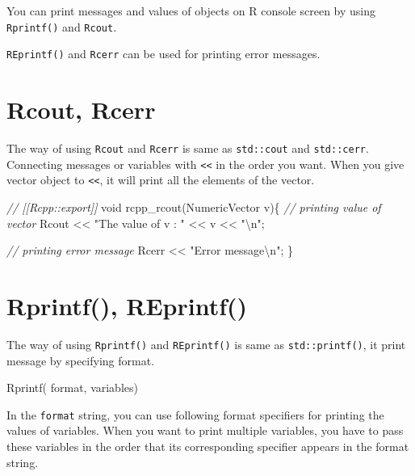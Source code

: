 \documentclass[]{book}
\newenvironment{Shaded}{\begin{snugshade}}{\end{snugshade}}
\newcommand{\DataTypeTok}[1]{\textcolor[rgb]{0.13,0.29,0.53}{#1}}
\newcommand{\SpecialCharTok}[1]{\textcolor[rgb]{0.00,0.00,0.00}{#1}}
\newcommand{\StringTok}[1]{\textcolor[rgb]{0.31,0.60,0.02}{#1}}
\newcommand{\CommentTok}[1]{\textcolor[rgb]{0.56,0.35,0.01}{\textit{#1}}}
\newcommand{\NormalTok}[1]{#1}
\theoremstyle{definition}
\theoremstyle{definition}
\theoremstyle{remark}
\begin{document}
You can print messages and values of objects on R console screen by
using \texttt{Rprintf()} and \texttt{Rcout}.

\texttt{REprintf()} and \texttt{Rcerr} can be used for printing error
messages.

\section{Rcout, Rcerr}\label{rcout-rcerr}

The way of using \texttt{Rcout} and \texttt{Rcerr} is same as
\texttt{std::cout} and \texttt{std::cerr}. Connecting messages or
variables with \texttt{\textless{}\textless{}} in the order you want.
When you give vector object to \texttt{\textless{}\textless{}}, it will
print all the elements of the vector.

\begin{Shaded}
\begin{Highlighting}[]
\CommentTok{// [[Rcpp::export]]}
\DataTypeTok{void}\NormalTok{ rcpp_rcout(NumericVector v)\{}
  \CommentTok{// printing value of vector}
\NormalTok{  Rcout << }\StringTok{"The value of v : "}\NormalTok{ << v << }\StringTok{"}\SpecialCharTok{\textbackslash{}n}\StringTok{"}\NormalTok{;}

  \CommentTok{// printing error message}
\NormalTok{  Rcerr << }\StringTok{"Error message}\SpecialCharTok{\textbackslash{}n}\StringTok{"}\NormalTok{;}
\NormalTok{\}}
\end{Highlighting}
\end{Shaded}

\section{Rprintf(), REprintf()}\label{rprintf-reprintf}

The way of using \texttt{Rprintf()} and \texttt{REprintf()} is same as
\texttt{std::printf()}, it print message by specifying format.

\begin{Shaded}
\begin{Highlighting}[]
\NormalTok{Rprintf( format, variables)}
\end{Highlighting}
\end{Shaded}

In the \texttt{format} string, you can use following format specifiers
for printing the values of variables. When you want to print multiple
variables, you have to pass these variables in the order that its
corresponding specifier appears in the format string.
\end{document}
